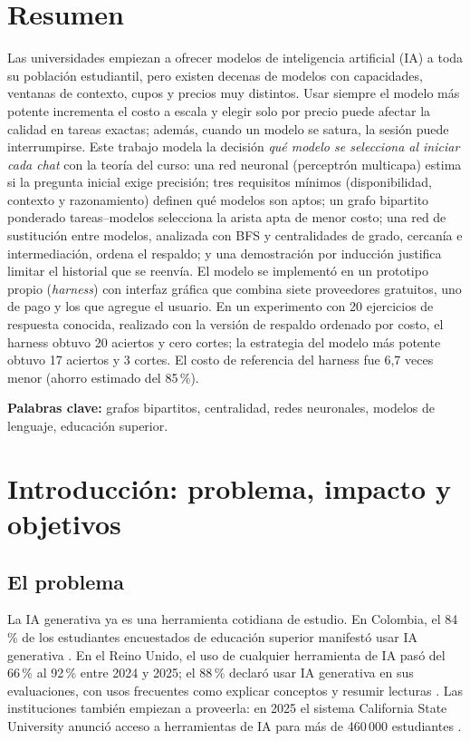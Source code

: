\documentclass[12pt,letterpaper]{article}
\begin{document}
\section*{Resumen}
Las universidades empiezan a ofrecer modelos de inteligencia artificial (IA) a toda su población estudiantil, pero existen decenas de modelos con capacidades, ventanas de contexto, cupos y precios muy distintos. Usar siempre el modelo más potente incrementa el costo a escala y elegir solo por precio puede afectar la calidad en tareas exactas; además, cuando un modelo se satura, la sesión puede interrumpirse. Este trabajo modela la decisión \emph{qué modelo se selecciona al iniciar cada chat} con la teoría del curso: una red neuronal (perceptrón multicapa) estima si la pregunta inicial exige precisión; tres requisitos mínimos (disponibilidad, contexto y razonamiento) definen qué modelos son aptos; un grafo bipartito ponderado tareas--modelos selecciona la arista apta de menor costo; una red de sustitución entre modelos, analizada con BFS y centralidades de grado, cercanía e intermediación, ordena el respaldo; y una demostración por inducción justifica limitar el historial que se reenvía. El modelo se implementó en un prototipo propio (\emph{harness}) con interfaz gráfica que combina siete proveedores gratuitos, uno de pago y los que agregue el usuario. En un experimento con 20 ejercicios de respuesta conocida, realizado con la versión de respaldo ordenado por costo, el harness obtuvo 20 aciertos y cero cortes; la estrategia del modelo más potente obtuvo 17 aciertos y 3 cortes. El costo de referencia del harness fue 6,7 veces menor (ahorro estimado del 85\,\%).

\noindent\textbf{Palabras clave:} grafos bipartitos, centralidad, redes neuronales, modelos de lenguaje, educación superior.

\newpage
\section{Introducción: problema, impacto y objetivos}

\subsection{El problema}
La IA generativa ya es una herramienta cotidiana de estudio. En Colombia, el 84\,\% de los estudiantes encuestados de educación superior manifestó usar IA generativa \parencite{impactotic2024}. En el Reino Unido, el uso de cualquier herramienta de IA pasó del 66\,\% al 92\,\% entre 2024 y 2025; el 88\,\% declaró usar IA generativa en sus evaluaciones, con usos frecuentes como explicar conceptos y resumir lecturas \parencite{hepi2025}. Las instituciones también empiezan a proveerla: en 2025 el sistema California State University anunció acceso a herramientas de IA para más de 460\,000 estudiantes \parencite{axios2025csu}.
\end{document}
